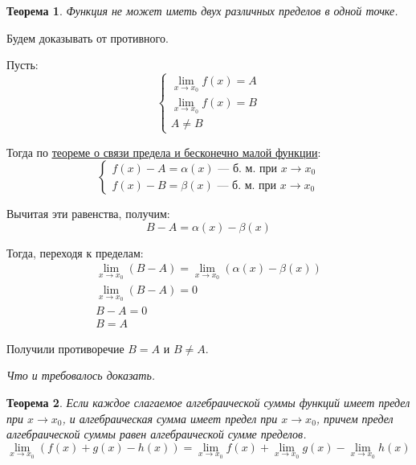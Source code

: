 \documentclass[a4paper,12pt,oneside]{extbook}
\newcommand{\newpar}{$ $\par\nobreak\ignorespaces}
\theoremstyle{numbered}
\theoremstyle{unnumbered}
\theoremstyle{named}
\newtheorem{theorem}{Теорема}[section]
\theoremstyle{unnumbered}
\theoremstyle{named}
\theoremstyle{named}
\theoremstyle{named}
\renewenvironment{proof}[1][]{\breakenv[Доказательство]{\if\relax\detokenize{#1}\relax\else\;\fi}{\textbf{#1}}}{\smallskip\newpar \hfill\textit{Что и требовалось доказать.}}
\newcommand{\plink}[2]{\hyperref[#1]{\color{blue}\underline{#2}}}
\begin{document}
\begin{theorem}
    Функция не может иметь двух различных пределов в одной точке.
\end{theorem}

\begin{proof}
    Будем доказывать от противного.

    Пусть:
    \[
        \begin{cases}
            \displaystyle
            \lim_{x \to x_0}{f(x)} = A \\
            \displaystyle
            \lim_{x \to x_0}{f(x)} = B \\
            A \neq B
        \end{cases}
    \]

    Тогда по \plink{theorem:Теорема о связи функции, ее предела и бесконечно малой функции}{теореме о связи предела и бесконечно малой функции}:
    \[
        \begin{cases}
            f(x) - A = \alpha(x) \text{ — б. м. при } x \to x_0 \\
            f(x) - B = \beta(x) \text{ — б. м. при } x \to x_0
        \end{cases}
    \]

    Вычитая эти равенства, получим:
    \[
        B - A = \alpha(x) - \beta(x)
    \]

    Тогда, переходя к пределам:
    \begin{gather*}
        \lim_{x \to x_0}{(B - A)} = \lim_{x \to x_0}{(\alpha(x) - \beta(x))} \\
        \lim_{x \to x_0}{(B - A)} = 0 \\
        B - A = 0 \\
        B = A
    \end{gather*}

    Получили противоречие \(B = A\) и \(B \neq A\).
\end{proof}

\begin{theorem}
    Если каждое слагаемое алгебраической суммы функций имеет предел при \(x \to x_0\), и алгебраическая сумма имеет предел при \(x \to x_0\), причем предел алгебраической суммы равен алгебраической сумме пределов.
    \[
        \lim_{x \to x_0}{(f(x) + g(x) - h(x))} = \lim_{x \to x_0}{f(x)} + \lim_{x \to x_0}{g(x)} - \lim_{x \to x_0}{h(x)}
    \]
\end{theorem}
\end{document}
